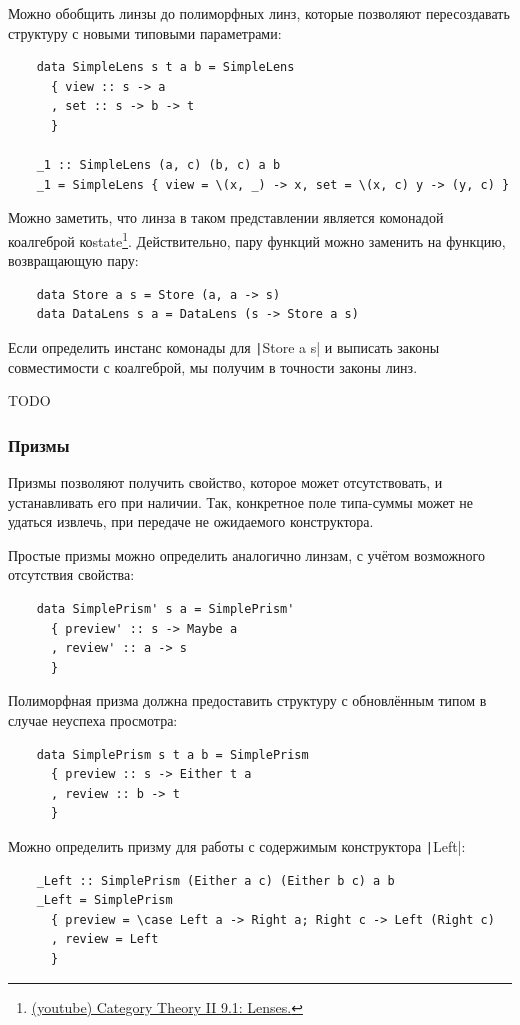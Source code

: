 Можно обобщить линзы до полиморфных линз, которые позволяют пересоздавать структуру с новыми типовыми параметрами:
\begin{verbatim}
    data SimpleLens s t a b = SimpleLens
      { view :: s -> a
      , set :: s -> b -> t
      }

    _1 :: SimpleLens (a, c) (b, c) a b
    _1 = SimpleLens { view = \(x, _) -> x, set = \(x, c) y -> (y, c) }
\end{verbatim}

Можно заметить, что линза в таком представлении является комонадой коалгеброй коstate\footnote{\href{https://youtu.be/9_iYlp8smc8?si=NLka0vnnhYDdTfgm}{(youtube) Category Theory II 9.1: Lenses.}}.
Действительно, пару функций можно заменить на функцию, возвращающую пару:
\begin{verbatim}
    data Store a s = Store (a, a -> s)
    data DataLens s a = DataLens (s -> Store a s)
\end{verbatim}

Если определить инстанс комонады для \texttt|Store a s| и выписать законы совместимости с коалгеброй, мы получим в точности законы линз.

TODO %

\subsubsection{Призмы}

Призмы позволяют получить свойство, которое может отсутствовать, и устанавливать его при наличии.
Так, конкретное поле типа-суммы может не удаться извлечь, при передаче не ожидаемого конструктора.

Простые призмы можно определить аналогично линзам, с учётом возможного отсутствия свойства:

\begin{verbatim}
    data SimplePrism' s a = SimplePrism'
      { preview' :: s -> Maybe a
      , review' :: a -> s
      }
\end{verbatim}

Полиморфная призма должна предоставить структуру с обновлённым типом в случае неуспеха просмотра:
\begin{verbatim}
    data SimplePrism s t a b = SimplePrism
      { preview :: s -> Either t a
      , review :: b -> t
      }
\end{verbatim}

Можно определить призму для работы с содержимым конструктора \texttt|Left|:
\begin{verbatim}
    _Left :: SimplePrism (Either a c) (Either b c) a b
    _Left = SimplePrism
      { preview = \case Left a -> Right a; Right c -> Left (Right c)
      , review = Left
      }
\end{verbatim}

